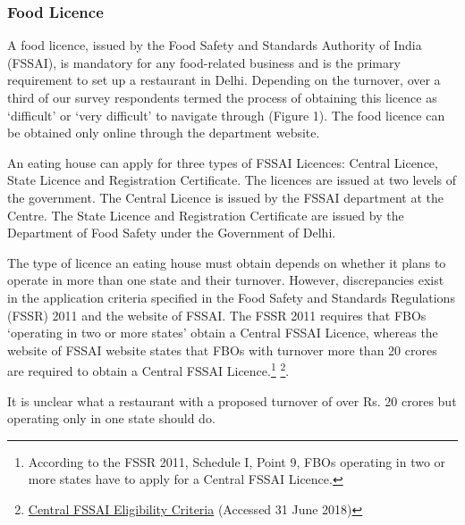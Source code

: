 \documentclass[a4paper, 12pt]{article}
\begin{document}
                    
                                        
                    \subsubsection{Food Licence}
                    A food licence, issued by the Food Safety and Standards Authority of India (FSSAI), is mandatory for any food-related business and is the primary requirement to set up a restaurant in Delhi. Depending on the turnover, over a third of our survey 
respondents termed the process of obtaining this licence as ‘difficult’ or ‘very difficult’ to navigate through (Figure 1). The food licence can be obtained only online through the department website.
                    
                    An eating house can apply for three types of FSSAI Licences: Central Licence, State Licence and Registration Certificate. The licences are issued at two levels of the government. The Central Licence is issued by the FSSAI department at the Centre. 
The State Licence and Registration Certificate are issued by the Department of Food Safety under the Government of Delhi.
                    
                    The type of licence an eating house must obtain depends on whether it plans to operate in more than one state and their turnover. However, discrepancies exist in the application criteria specified in the Food Safety and Standards Regulations 
(FSSR) 2011 and the website of FSSAI. The FSSR 2011 requires that FBOs ‘operating in two or more states’ obtain a Central FSSAI Licence, whereas the website of FSSAI website states that FBOs with turnover more than 20 crores are required to obtain a 
Central FSSAI Licence.\footnote{According to the FSSR 2011, Schedule I, Point 9, FBOs operating in two or more states have to apply for a Central FSSAI Licence.} \footnote{\href{https://bit.ly/2pbFEXM}{Central FSSAI Eligibility Criteria} (Accessed 31 June 
2018)}.
                    
                    It is unclear what a restaurant with a proposed turnover of over Rs. 20 crores but operating only in one state should do. %
                    
\end{document}
